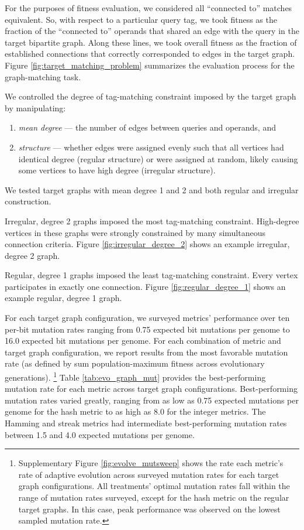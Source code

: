 For the purposes of fitness evaluation, we considered all ``connected to'' matches equivalent.
So, with respect to a particular query tag, we took fitness as the fraction of the ``connected to'' operands that shared an edge with the query in the target bipartite graph.
Along these lines, we took overall fitness as the fraction of established connections that correctly corresponded to edges in the target graph.
Figure \ref{fig:target_matching_problem} summarizes the evaluation process for the graph-matching task.

We controlled the degree of tag-matching constraint imposed by the target graph by manipulating:
\begin{enumerate}
  \item \textit{mean degree} --- the number of edges between queries and operands, and
  \item \textit{structure} --- whether edges were assigned evenly such that all vertices had identical degree (regular structure) or were assigned at random, likely causing some vertices to have high degree (irregular structure).
\end{enumerate}
We tested target graphs with mean degree 1 and 2 and both regular and irregular construction.

Irregular, degree 2 graphs imposed the most tag-matching constraint.
High-degree vertices in these graphs were strongly constrained by many simultaneous connection criteria.
Figure \ref{fig:irregular_degree_2} shows an example irregular, degree 2 graph.

Regular, degree 1 graphs imposed the least tag-matching constraint.
Every vertex participates in exactly one connection.
Figure \ref{fig:regular_degree_1} shows an example regular, degree 1 graph.

For each target graph configuration, we surveyed metrics' performance over ten per-bit mutation rates ranging from 0.75 expected bit mutations per genome to 16.0 expected bit mutations per genome.
For each combination of metric and target graph configuration, we report results from the most favorable mutation rate (as defined by sum population-maximum fitness across evolutionary generations).%
\footnote{%
Supplementary Figure \ref{fig:evolve_mutsweep} shows the rate each metric's rate of adaptive evolution across surveyed mutation rates for each target graph configurations.
All treatments' optimal mutation rates fall within the range of mutation rates surveyed, except for the hash metric on the regular target graphs.
In this case, peak performance was observed on the lowest sampled mutation rate.
}
Table \ref{tab:evo_graph_mut} provides the best-performing mutation rate for each metric across target graph configurations.
Best-performing mutation rates varied greatly, ranging from as low as 0.75 expected mutations per genome for the hash metric to as high as 8.0 for the integer metrics.
The Hamming and streak metrics had intermediate best-performing mutation rates between 1.5 and 4.0 expected mutations per genome.

